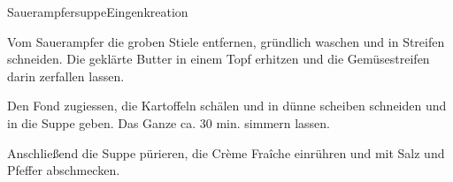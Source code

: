 \begin{recipe}{Sauerampfersuppe}{Eingenkreation}
  \inglist
  
  \steps
  Vom Sauerampfer die groben Stiele entfernen, gründlich waschen und in Streifen
  schneiden. Die geklärte Butter in einem Topf erhitzen und die Gemüsestreifen darin
  zerfallen lassen.

  Den Fond zugiessen, die Kartoffeln schälen und in dünne scheiben schneiden und in die
  Suppe geben. Das Ganze ca. 30 min. simmern lassen.

  Anschließend die Suppe pürieren, die Crème Fraîche einrühren und mit Salz und Pfeffer 
  abschmecken.
\end{recipe}


